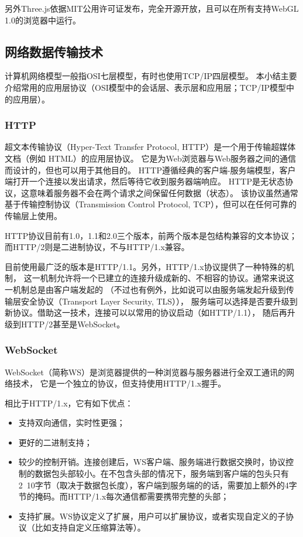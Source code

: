 另外Three.js依据MIT公用许可证发布，完全开源开放，且可以在所有支持WebGL 1.0的浏览器中运行。

\subsection{网络数据传输技术}

计算机网络模型一般指OSI七层模型，有时也使用TCP/IP四层模型。
本小结主要介绍常用的应用层协议（OSI模型中的会话层、表示层和应用层；TCP/IP模型中的应用层）。

\subsubsection{HTTP}

超文本传输协议\cite{rfc7230}（Hyper-Text Transfer Protocol, HTTP）是一个用于传输超媒体文档（例如 HTML）的应用层协议。
它是为Web浏览器与Web服务器之间的通信而设计的，但也可以用于其他目的。
HTTP遵循经典的客户端-服务端模型，客户端打开一个连接以发出请求，然后等待它收到服务器端响应。
HTTP是无状态协议，这意味着服务器不会在两个请求之间保留任何数据（状态）。
该协议虽然通常基于传输控制协议\cite{rfc793}（Transmission Control Protocol, TCP），但可以在任何可靠的传输层上使用。

HTTP协议目前有1.0，1.1和2.0三个版本，前两个版本是包结构兼容的文本协议；而HTTP/2则是二进制协议\cite{rfc7540}，不与HTTP/1.x兼容。

目前使用最广泛的版本是HTTP/1.1。另外，HTTP/1.x协议提供了一种特殊的机制，
这一机制允许将一个已建立的连接升级成新的、不相容的协议。通常来说这一机制总是由客户端发起的
（不过也有例外，比如说可以由服务端发起升级到传输层安全协议\cite{rfc8446}（Transport Layer Security, TLS）），
服务端可以选择是否要升级到新协议。借助这一技术，连接可以以常用的协议启动（如HTTP/1.1），
随后再升级到HTTP/2甚至是WebSocket\cite{rfc6455}。

\subsubsection{WebSocket}

WebSocket（简称WS）是浏览器提供的一种浏览器与服务器进行全双工通讯的网络技术，
它是一个独立的协议，但支持使用HTTP/1.x握手。

相比于HTTP/1.x，它有如下优点：

\begin{itemize}
    \item 支持双向通信，实时性更强；
    \item 更好的二进制支持；
    \item 较少的控制开销。连接创建后，WS客户端、服务端进行数据交换时，协议控制的数据包头部较小。在不包含头部的情况下，服务端到客户端的包头只有2~10字节（取决于数据包长度），客户端到服务端的的话，需要加上额外的4字节的掩码。而HTTP/1.x每次通信都需要携带完整的头部；
    \item 支持扩展。WS协议定义了扩展，用户可以扩展协议，或者实现自定义的子协议（比如支持自定义压缩算法等）。
\end{itemize}

